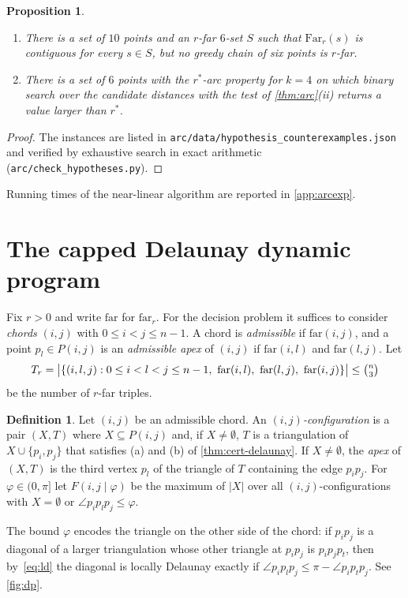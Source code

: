 \documentclass[11pt,a4paper]{article}
\newtheorem{proposition}[theorem]{Proposition}
\theoremstyle{definition}
\newtheorem{definition}[theorem]{Definition}
\theoremstyle{remark}
\newcommand{\far}{\mathrm{far}}
\newcommand{\ang}{\angle}
\newcommand{\rstar}{r^{*}}
\newcommand{\Tr}{T_r}
\newcommand{\code}[1]{\nolinkurl{#1}}
\begin{document}
\begin{proposition}\label{prop:weaker}
\begin{enumerate}[label=(\alph*),itemsep=1pt,topsep=2pt]
\item There is a set of $10$ points and an $r$-far $6$-set $S$ such that
$\mathrm{Far}_r(s)$ is contiguous for every $s\in S$, but no greedy chain of six
points is $r$-far.
\item There is a set of $6$ points with the $\rstar$-arc property for $k=4$ on
which binary search over the candidate distances with the test of
\cref{thm:arc}(ii) returns a value larger than $\rstar$.
\end{enumerate}
\end{proposition}
\begin{proof}
The instances are listed in \code{arc/data/hypothesis_counterexamples.json} and
verified by exhaustive search in exact arithmetic
(\code{arc/check\_hypotheses.py}).
\end{proof}

Running times of the near-linear algorithm are reported in \cref{app:arcexp}.

\section{The capped Delaunay dynamic program}\label{sec:dp}

Fix $r>0$ and write $\far$ for $\far_r$. For the decision problem it suffices
to consider \emph{chords} $(i,j)$ with $0\le i<j\le n-1$. A chord is
\emph{admissible} if $\far(i,j)$, and a point $p_l\in P(i,j)$ is an
\emph{admissible apex} of $(i,j)$ if $\far(i,l)$ and $\far(l,j)$. Let
\[
\Tr=\bigl|\{(i,l,j): 0\le i<l<j\le n-1,\ \far(i,l),\ \far(l,j),\ \far(i,j)\}\bigr|\le\tbinom n3
\]
be the number of $r$-far triples.

\begin{definition}\label{def:config}
Let $(i,j)$ be an admissible chord. An \emph{$(i,j)$-configuration} is a pair
$(X,T)$ where $X\subseteq P(i,j)$ and, if $X\neq\emptyset$, $T$ is a
triangulation of $X\cup\{p_i,p_j\}$ that satisfies (a) and (b) of
\cref{thm:cert-delaunay}. If $X\ne\emptyset$, the \emph{apex} of $(X,T)$ is
the third vertex $p_l$ of the triangle of $T$ containing the edge $p_ip_j$.
For $\varphi\in(0,\pi]$ let $F(i,j\mid\varphi)$ be the maximum of $|X|$ over
all $(i,j)$-configurations with $X=\emptyset$ or $\ang p_ip_lp_j\le\varphi$.
\end{definition}

The bound $\varphi$ encodes the triangle on the other side of the chord: if
$p_ip_j$ is a diagonal of a larger triangulation whose other triangle at
$p_ip_j$ is $p_ip_jp_t$, then by~\eqref{eq:ld} the diagonal is locally
Delaunay exactly if $\ang p_ip_lp_j\le\pi-\ang p_ip_tp_j$. See
\cref{fig:dp}.
\end{document}
